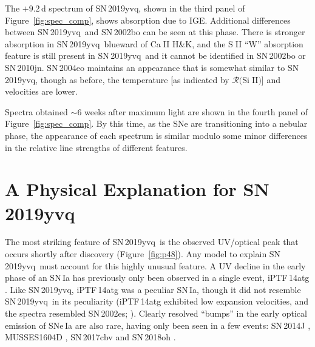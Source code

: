\documentclass[twocolumn]{aastex63}
\def\ion#1#2{#1$\;${\footnotesize\rm{#2}}\relax}
\newcommand{\RSiII}{$\mathcal{R}($\ion{Si}{II}$)$}
\newcommand{\sn}{SN\,2019yvq}
\begin{document}
The $+9.2$\,d spectrum of \sn, shown in the third panel of
Figure~\ref{fig:spec_comp}, shows absorption due to IGE. Additional
differences between \sn\ and SN\,2002bo can be seen at this phase. There is
stronger absorption in \sn\ blueward of \ion{Ca}{II} H\&K, and the \ion{S}{II}
``W'' absorption feature is still present in \sn\ and it cannot be identified
in SN\,2002bo or SN\,2010jn. SN\,2004eo maintains an appearance that is
somewhat similar to \sn, though as before, the temperature [as indicated by
\RSiII] and velocities are lower.

Spectra obtained $\sim$6 weeks after maximum light are shown in the fourth
panel of Figure~\ref{fig:spec_comp}. By this time, as the SNe are
transitioning into a nebular phase, the appearance of each spectrum is similar
modulo some minor differences in the relative line strengths of different
features.

\section{A Physical Explanation for \sn}\label{sec:models}

The most striking feature of \sn\ is the observed UV/optical peak that occurs
shortly after discovery (Figure~\ref{fig:p48}). Any model to explain \sn\ must
account for this highly unusual feature. A UV decline in the early phase of an
SN\,Ia has previously only been observed in a single event, iPTF\,14atg
\citep{Cao15}. Like \sn, iPTF\,14atg was a peculiar SN\,Ia, though it did not
resemble \sn\ in its peculiarity (iPTF\,14atg exhibited low expansion
velocities, and the spectra resembled SN\,2002es;
\citealt{Ganeshalingam12,Cao15}). Clearly resolved ``bumps'' in the early
optical emission of SNe\,Ia are also rare, having only been seen in a few
events: SN\,2014J \citep{Goobar15}, MUSSES1604D \citep{Jiang17}, SN\,2017cbv
\citep{Hosseinzadeh17} and SN\,2018oh \citep{Dimitriadis19,Shappee19}.
\end{document}
